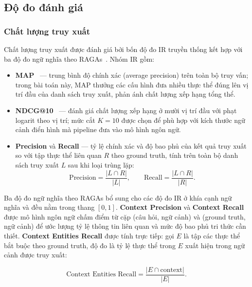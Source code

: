 \subsection{Độ đo đánh giá}

\subsubsection{Chất lượng truy xuất}

Chất lượng truy xuất được đánh giá bởi bốn độ đo IR truyền thống kết hợp với ba độ đo ngữ nghĩa theo RAGAs~\cite{es2023ragas}. Nhóm IR gồm:

\begin{itemize}
  \item \textbf{MAP}~\cite{manning2008ir} --- trung bình độ chính xác (average precision) trên toàn bộ truy vấn; trong bài toán này, MAP thưởng các cấu hình đưa nhiều thực thể đúng lên vị trí đầu của danh sách truy xuất, phản ánh chất lượng xếp hạng tổng thể.

  \item \textbf{NDCG@10}~\cite{jarvelin2002ndcg} --- đánh giá chất lượng xếp hạng ở mười vị trí đầu với phạt logarit theo vị trí; mức cắt $K = 10$ được chọn để phù hợp với kích thước ngữ cảnh điển hình mà pipeline đưa vào mô hình ngôn ngữ.

  \item \textbf{Precision} và \textbf{Recall} --- tỷ lệ chính xác và độ bao phủ của kết quả truy xuất so với tập thực thể liên quan $R$ theo ground truth, tính trên toàn bộ danh sách truy xuất $L$ sau khi loại trùng lặp:
    \begin{equation}
      \text{Precision} = \frac{|L \cap R|}{|L|}, \qquad \text{Recall} = \frac{|L \cap R|}{|R|}.
    \end{equation}
\end{itemize}

Ba độ đo ngữ nghĩa theo RAGAs \cite{es2023ragas} bổ sung cho các độ đo IR ở khía cạnh ngữ nghĩa và đều nằm trong thang $[0, 1]$. \textbf{Context Precision} và \textbf{Context Recall} được mô hình ngôn ngữ chấm điểm từ cặp (câu hỏi, ngữ cảnh) và (ground truth, ngữ cảnh) để ước lượng tỷ lệ thông tin liên quan và mức độ bao phủ tri thức cần thiết. \textbf{Context Entities Recall} được tính trực tiếp: gọi $E$ là tập các thực thể bắt buộc theo ground truth, độ đo là tỷ lệ thực thể trong $E$ xuất hiện trong ngữ cảnh được truy xuất:

\begin{equation}
\text{Context Entities Recall} = \frac{|E \cap \text{context}|}{|E|}.
\end{equation}

